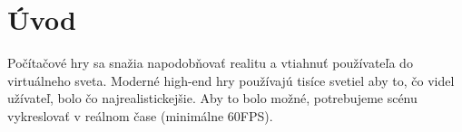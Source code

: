 \chapter{Úvod}
Počítačové hry sa snažia napodobňovať realitu a vtiahnuť používateľa do virtuálneho sveta. Moderné high-end hry používajú tisíce svetiel aby to, čo videl užívateľ, bolo čo najrealistickejšie. Aby to bolo možné, potrebujeme scénu vykreslovať v reálnom čase (minimálne 60FPS). 

